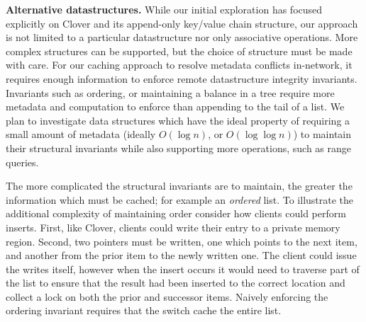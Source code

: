 
\textbf{Alternative datastructures.}
While our initial exploration has focused explicitly on Clover and its
append-only key/value chain structure, our approach is not limited to
a particular datastructure nor only associative operations. More
complex structures can be supported, but the choice of structure must
be made with care.  For our caching approach to resolve metadata
conflicts in-network, it requires enough information to enforce remote
datastructure integrity invariants. Invariants such as ordering, or
maintaining a balance in a tree require more metadata and computation
to enforce than appending to the tail of a list. We plan to
investigate data structures which have the ideal property of requiring
a small amount of metadata (ideally $O(\log n)$, or $O(\log\log n)$) to
maintain their structural invariants while also supporting more
operations, such as range queries.


The more complicated the structural invariants are to maintain, the
greater the information which must be cached; for example an
\textit{ordered} list.  To illustrate the additional complexity of
maintaining order consider how clients could perform inserts. First,
like Clover, clients could write their entry to a private memory
region. Second, two pointers must be written, one which points to the
next item, and another from the prior item to the newly written
one. The client could issue the writes itself, however when the insert
occurs it would need to traverse part of the list to ensure that the
result had been inserted to the correct location and collect a lock on
both the prior and successor items. Naively enforcing the ordering
invariant requires that the switch cache the entire list.


